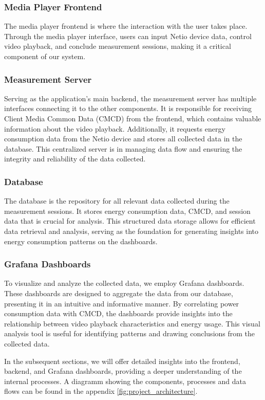 \subsubsection{Media Player Frontend} The media player frontend is where the interaction with the user takes place. 
Through the media player interface, users can input Netio device data, control video playback, and conclude measurement sessions, making it a critical component of our system.

\subsubsection{Measurement Server} Serving as the application's main backend, the measurement server has multiple interfaces connecting it to the other components. 
It is responsible for receiving Client Media Common Data (CMCD) from the frontend, which contains valuable information about the video playback. 
Additionally, it requests energy consumption data from the Netio device and stores all collected data in the database. 
This centralized server is in managing data flow and ensuring the integrity and reliability of the data collected.

\subsubsection{Database} The database is the repository for all relevant data collected during the measurement sessions. 
It stores energy consumption data, CMCD, and session data that is crucial for analysis. 
This structured data storage allows for efficient data retrieval and analysis, serving as the foundation for generating insights into energy consumption patterns on the dashboards.

\subsubsection{Grafana Dashboards} To visualize and analyze the collected data, we employ Grafana dashboards. 
These dashboards are designed to aggregate the data from our database, presenting it in an intuitive and informative manner. 
By correlating power consumption data with CMCD, the dashboards provide insights into the relationship between video playback characteristics and energy usage. 
This visual analysis tool is useful for identifying patterns and drawing conclusions from the collected data.

In the subsequent sections, we will offer detailed insights into the frontend, backend, and Grafana dashboards, providing a deeper understanding of the internal processes. A diagramm showing the components, processes and data flows can be found in the appendix \ref{fig:project_architecture}.

